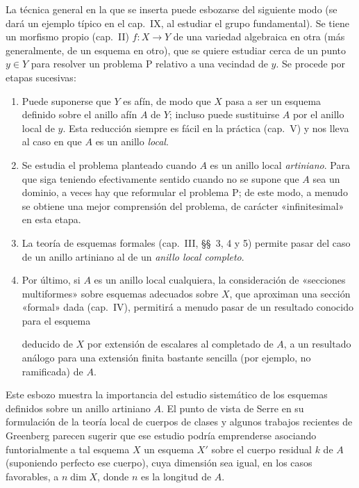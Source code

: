 La técnica general en la que se inserta puede esbozarse del siguiente modo (se dará un ejemplo típico en el cap.~IX, al estudiar el grupo fundamental).
Se tiene un morfismo propio (cap.~II) $f:X\to Y$ de una variedad algebraica en otra (más generalmente, de un esquema en otro), que se quiere estudiar cerca de un punto $y\in Y$ para resolver un problema P relativo a una vecindad de $y$.
Se procede por etapas sucesivas:
\begin{enumerate}
  \item[$1^\circ$] Puede suponerse que $Y$ es afín, de modo que $X$ pasa a ser un esquema definido sobre el anillo afín $A$ de $Y$; incluso puede sustituirse $A$ por el anillo local de $y$.
  Esta reducción siempre es fácil en la práctica (cap.~V) y nos lleva al caso en que $A$ es un anillo \emph{local}.
  \item[$2^\circ$] Se estudia el problema planteado cuando $A$ es un anillo local \emph{artiniano}.
  Para que siga teniendo efectivamente sentido cuando no se supone que $A$ sea un dominio, a veces hay que reformular el problema P; de este modo, a menudo se obtiene una mejor comprensión del problema, de carácter «infinitesimal» en esta etapa.
  \item[$3^\circ$] La teoría de esquemas formales (cap.~III, \S\S~3, 4 y 5) permite pasar del caso de un anillo artiniano al de un \emph{anillo local completo}.
  \item[$4^\circ$] Por último, si $A$ es un anillo local cualquiera, la consideración de «secciones multiformes» sobre esquemas adecuados sobre $X$, que aproximan una sección «formal» dada (cap.~IV), permitirá a menudo pasar de un resultado conocido para el esquema

  deducido de $X$ por extensión de escalares al completado de $A$, a un resultado análogo para una extensión finita bastante sencilla (por ejemplo, no ramificada) de $A$.
\end{enumerate}

Este esbozo muestra la importancia del estudio sistemático de los esquemas definidos sobre un anillo artiniano $A$.
El punto de vista de Serre en su formulación de la teoría local de cuerpos de clases y algunos trabajos recientes de Greenberg parecen sugerir que ese estudio podría emprenderse asociando funtorialmente a tal esquema $X$ un esquema $X'$ sobre el cuerpo residual $k$ de $A$ (suponiendo perfecto ese cuerpo), cuya dimensión sea igual, en los casos favorables, a $n\dim X$, donde $n$ es la longitud de $A$.

